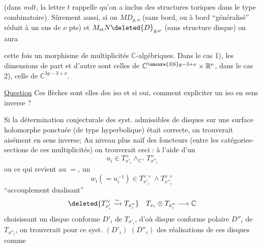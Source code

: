 
(dans $mdt$, la lettre $t$ rappelle qu'on a inclus
des structures toriques dans le type
combinatoire). Sûrement aussi, si on
  $MD_{g,\nu}$ (sans bord, ou à bord
``généralisé'' réduit à un ens de $\nu$ pts)
et $M_{\mathrm{st}}N\deleted{D}_{g,\nu}$ (sans structure disque) on
aura


cette fois un morphisme de 
multiplicités  $\mathbb C$-algébriques.
Dans le cas 1), les dimensions  de
part et d'autre sont celles de $\mathbb C^{\unsure{3|6}g-3+\nu}\times\mathbb R^\nu$,
 dans le cas 2),  celle de $\mathbb C^{3g-3+\nu}$.

\uline{Question} Ces flèches sont elles des iso
\deleted{\unsure{--}} et si oui, comment expliciter un
iso en sens inverse ? 

Si la détermination conjecturale des
syst. admissibles de disques sur une
surface holomorphe  ponctuée (de type
hyperbolique) était correcte, on trouverait aisément
  en sens
inverse; Au niveau plus naïf des
foncteurs (entre les catégories-sections
de ces multiplicités) on trouverait
ceci : à l'aide d'un 
\[
u_i\in T_{x'_i}^{\times}\wedge_{\mathbb C^\times}T_{x''_i}^{\times}
\]
ou ce qui revient au $=$, un
\[
w_i(=u_i^{-1})\in T_{x'_i}^{\vee\times}\wedge T_{x''_i}^{\vee\times}
\]
  ``accouplement dualisant''
\[
\deleted{T_{x'_i}^{\vee}\xrightarrow{\sim} T_{x''_i}}\quad T_{x_i}\otimes T_{x''_i}\longrightarrow\mathbb C
\]
choisissant un  disque conforme
$D'_i$ de $T_{x'_i}$,  d'où disque
conforme polaire $D''_i$ de $T_{x''_i}$, on
trouverait  pour ce syst. $(D'_i)$ $(D''_i)$
des réalisations de ces disques comme

